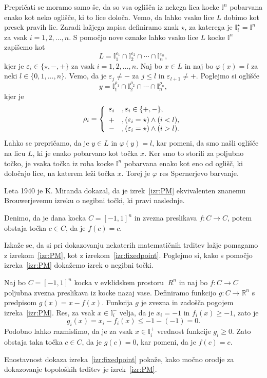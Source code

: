 \documentclass[mat1]{fmfdelo}
\newcommand{\R}{\mathbb R}
\newcommand{\I}{\mathbb I}
\newcommand{\0}{\underline{0}}
\begin{document}
\begin{dokaz}
Prepričati se moramo samo še, da so vsa oglišča iz nekega lica kocke $\I^n$ pobarvana enako kot neko oglišče, ki to lice določa. Vemo, da lahko vsako lice $L$ dobimo kot presek pravih lic. Zaradi lažjega zapisa definiramo znak $\star$, za katerega je $\I_i^{\star} = \I^n$ za vsak $i = 1, 2, \dots, n$. S pomočjo nove oznake lahko vsako lice $L$ kocke $\I^n$ zapišemo kot 
$$L = \I_1^{\varepsilon_1} \cap \I_2^{\varepsilon_2} \cap \cdots \cap \I_n^{\varepsilon_n},$$
kjer je $\varepsilon_i \in \{ \star, -, + \}$ za vsak $i = 1, 2, \dots, n$. Naj bo $x \in L$ in naj bo $\varphi (x) = l$ za neki $l \in \{ 0, 1, \dots, n \}$. Vemo, da je $\varepsilon_j \neq -$ za $j \leq l$ in $\varepsilon_{l+1} \neq +$. Poglejmo si oglišče 
$$y = \I_1^{\rho_1} \cap \I_2^{\rho_2} \cap \cdots \cap \I_n^{\rho_n},$$
kjer je
\[  \rho_i =  \left\{
\begin{array}{cl}\vspace{3pt}
	\varepsilon_i &, \varepsilon_i \in \{ +, - \},\\
	+ &, (\varepsilon_i = \star) \land (i < l), \\
	- &, (\varepsilon_i = \star) \land (i > l). \\
\end{array} 
\right. \]
Lahko se prepričamo, da je $y \in L$ in $\varphi (y) = l$, kar pomeni, da smo našli oglišče na licu $L$, ki je enako pobarvano kot točka $x$. Ker smo to storili za poljubno točko, je vsaka točka iz roba kocke $\I^n$ pobarvana enako kot eno od oglišč, ki določajo lice, na katerem leži točka $x$. Torej je $\varphi$ res Spernerjevo barvanje.
\end{dokaz}
Leta 1940 je K. Miranda dokazal, da je izrek~\ref{izr:PM} ekvivalenten znanemu Brouwerjevemu izreku o negibni točki, ki pravi naslednje.
\begin{izrek}\label{izr:fixedpoint}
Denimo, da je dana kocka $C = [-1, 1]^n$ in zvezna preslikava $f : C \to C$, potem obstaja točka $c \in C$, da je $f(c) = c$.
\end{izrek}
Izkaže se, da si pri dokazovanju nekaterih matematičnih trditev lažje pomagamo z izrekom~\ref{izr:PM}, kot z izrekom~\ref{izr:fixedpoint}. Poglejmo si, kako s pomočjo izreka~\ref{izr:PM} dokažemo izrek o negibni točki. 

\begin{dokaz}
Naj bo $C = [-1, 1]^n$ kocka v evklidskem prostoru $~R^n$ in naj bo $f : C \to C$ poljubna zvezna preslikava iz kocke nazaj vase. Definiramo funkcijo $g : C \to \R^n$ s predpisom $g(x) = x - f(x)$. Funkcija $g$ je zvezna in zadošča pogojem izreka~\ref{izr:PM}. Res, za vsak $x \in \I_i^-$ velja, da je $x_i = -1$ in $f_i(x) \geq -1$, zato je 
$$g_i(x) = x_i - f_i(x) \leq -1 - (-1) =0.$$
Podobno lahko razmislimo, da je za vsak $x \in \I_i^+$ vrednost funkcije $g_i \geq 0$. Zato obstaja taka točka $c \in C$, da je $g(c) = 0$, kar pomeni, da je $f(c) = c$.
\end{dokaz}
Enostavnost dokaza izreka~\ref{izr:fixedpoint} pokaže, kako močno orodje za dokazovanje topoloških trditev je izrek~\ref{izr:PM}.
\end{document}
